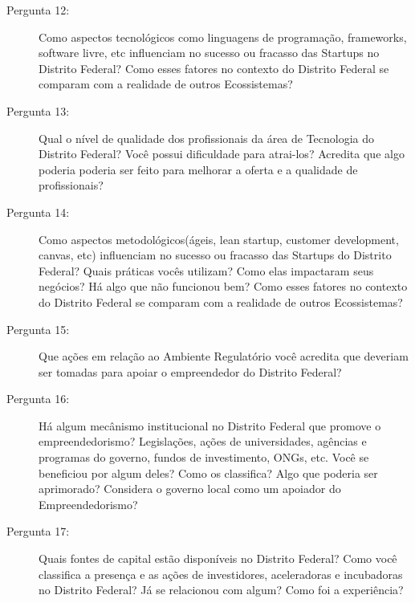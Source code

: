 \begin{apendicesenv}
\begin{description}

  \item [Pergunta 12:] Como aspectos tecnológicos como linguagens de programação, frameworks, software livre, etc influenciam no sucesso ou fracasso das Startups no Distrito Federal? Como esses fatores no contexto do Distrito Federal se comparam com a realidade de outros Ecossistemas? 

  \item [Pergunta 13:] Qual o nível de qualidade dos profissionais da área de Tecnologia do Distrito Federal? Você possui dificuldade para atrai-los? Acredita que algo poderia poderia ser feito para melhorar a oferta e a qualidade de profissionais?
  
  \item [Pergunta 14:] Como aspectos metodológicos(ágeis, lean startup, customer development, canvas, etc) influenciam no sucesso ou fracasso das Startups do Distrito Federal? Quais práticas vocês utilizam? Como elas impactaram seus negócios? Há algo que não funcionou bem? Como esses fatores no contexto do Distrito Federal se comparam com a realidade de outros Ecossistemas?


  \item [Pergunta 15:] Que ações em relação ao Ambiente Regulatório você acredita que deveriam ser tomadas para apoiar o empreendedor do Distrito Federal?

  \item [Pergunta 16:] Há algum mecânismo institucional no Distrito Federal que promove o empreendedorismo? Legislações, ações de universidades, agências e programas do governo, fundos de investimento, ONGs, etc. Você se beneficiou por algum deles? Como os classifica? Algo que poderia ser aprimorado? Considera o governo local como um apoiador do Empreendedorismo?

  \item [Pergunta 17:] Quais fontes de capital estão disponíveis no Distrito Federal? Como você classifica a presença e as ações de investidores, aceleradoras e incubadoras no Distrito Federal? Já se relacionou com algum? Como foi a experiência?


\end{description}
\end{apendicesenv}
